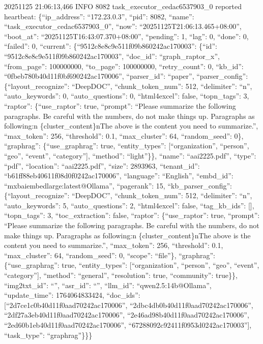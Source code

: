 \documentclass[letterpaper,10pt,english]{sphinxmanual}
\begin{document}
2025\sphinxhyphen{}11\sphinxhyphen{}25 21:06:13,466 INFO     8082 task\_executor\_cedac6537903\_0 reported heartbeat: \{“ip\_address”: “172.23.0.3”, “pid”: 8082, “name”: “task\_executor\_cedac6537903\_0”, “now”: “2025\sphinxhyphen{}11\sphinxhyphen{}25T21:06:13.465+08:00”, “boot\_at”: “2025\sphinxhyphen{}11\sphinxhyphen{}25T16:43:07.370+08:00”, “pending”: 1, “lag”: 0, “done”: 0, “failed”: 0, “current”: \{“9512c8e8c9e511f09b860242ac170003”: \{“id”: “9512c8e8c9e511f09b860242ac170003”, “doc\_id”: “graph\_raptor\_x”, “from\_page”: 100000000, “to\_page”: 100000000, “retry\_count”: 0, “kb\_id”: “0fbeb780b40d11f0bf690242ac170006”, “parser\_id”: “paper”, “parser\_config”: \{“layout\_recognize”: “DeepDOC”, “chunk\_token\_num”: 512, “delimiter”: “n”, “auto\_keywords”: 0, “auto\_questions”: 0, “html4excel”: false, “topn\_tags”: 3, “raptor”: \{“use\_raptor”: true, “prompt”: “Please summarize the following paragraphs. Be careful with the numbers, do not make things up. Paragraphs as following:n      \{cluster\_content\}nThe above is the content you need to summarize.”, “max\_token”: 256, “threshold”: 0.1, “max\_cluster”: 64, “random\_seed”: 0\}, “graphrag”: \{“use\_graphrag”: true, “entity\_types”: {[}“organization”, “person”, “geo”, “event”, “category”{]}, “method”: “light”\}\}, “name”: “aai2225.pdf”, “type”: “pdf”, “location”: “aai2225.pdf”, “size”: 2893963, “tenant\_id”: “b61ff88eb40611f08d0f0242ac170006”, “language”: “English”, “embd\_id”: “mxbai\sphinxhyphen{}embed\sphinxhyphen{}large:latest@Ollama”, “pagerank”: 15, “kb\_parser\_config”: \{“layout\_recognize”: “DeepDOC”, “chunk\_token\_num”: 512, “delimiter”: “n”, “auto\_keywords”: 5, “auto\_questions”: 2, “html4excel”: false, “tag\_kb\_ids”: {[}{]}, “topn\_tags”: 3, “toc\_extraction”: false, “raptor”: \{“use\_raptor”: true, “prompt”: “Please summarize the following paragraphs. Be careful with the numbers, do not make things up. Paragraphs as following:n      \{cluster\_content\}nThe above is the content you need to summarize.”, “max\_token”: 256, “threshold”: 0.1, “max\_cluster”: 64, “random\_seed”: 0, “scope”: “file”\}, “graphrag”: \{“use\_graphrag”: true, “entity\_types”: {[}“organization”, “person”, “geo”, “event”, “category”{]}, “method”: “general”, “resolution”: true, “community”: true\}\}, “img2txt\_id”: “”, “asr\_id”: “”, “llm\_id”: “qwen2.5:14b@Ollama”, “update\_time”: 1764064833424, “doc\_ids”: {[}“2d7ce1c0b40d11f0aad70242ac170006”, “2dbc4db0b40d11f0aad70242ac170006”, “2df27a3eb40d11f0aad70242ac170006”, “2e46ad98b40d11f0aad70242ac170006”, “2ed60b1eb40d11f0aad70242ac170006”, “67288092c92411f0953d0242ac170003”{]}, “task\_type”: “graphrag”\}\}\}
\end{document}
